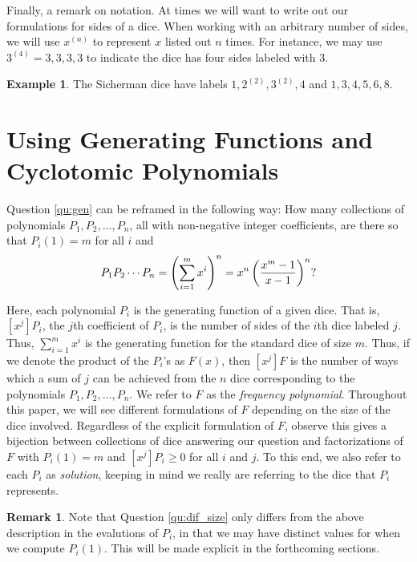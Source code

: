 \documentclass[11pt]{amsart}
\numberwithin{equation}{section}
\theoremstyle{plain}
\theoremstyle{definition}
\newtheorem{example}[equation]{Example}
\newtheorem{remark}[equation]{Remark}
\begin{document}
Finally, a remark on notation. At times we will want to write out our formulations for sides of a dice. When working with an arbitrary number of sides, we will use $x^{(n)}$ to represent $x$ listed out $n$ times. For instance, we may use $3^{(4)}=3,3,3,3$ to indicate the dice has four sides labeled with $3$.

\begin{example}
The Sicherman dice have labels $1,2^{(2)},3^{(2)},4$ and $1,3,4,5,6,8$.
\end{example}

\section{Using Generating Functions and Cyclotomic Polynomials} \label{sec:cyc}

Question \ref{qu:gen} can be reframed in the following way: How many collections of polynomials $P_1,P_2,\dots, P_n$, all with non-negative integer coefficients, are there so that  $P_i(1)=m$ for all $i$ and
\[P_1P_2\cdots P_n=\left( \sum_{i=1}^m x^i \right)^n=x^n\left( {x^m-1\over x-1}\right)^n?\]

Here, each polynomial $P_i$ is the generating function of a given dice. That is, $[x^j]P_i$, the $j$th coefficient of $P_i$, is the number of sides of the $i$th dice labeled $j$. Thus, $\displaystyle \sum_{i=1}^m x^i$ is the generating function for the standard dice of size $m$. Thus, if we denote the product of the $P_i$'s as $F(x)$, then $[x^j]F$ is the number of ways which a sum of $j$ can be achieved from the $n$ dice corresponding to the polynomials $P_1,P_2,\dots, P_n$. We refer to $F$ as the \textit{frequency polynomial}. Throughout this paper, we will see different formulations of $F$ depending on the size of the dice involved. Regardless of the explicit formulation of $F$, observe this gives a bijection between collections of dice answering our question and factorizations of $F$ with $P_i(1)=m$ and $[x^j]P_i\geq 0$ for all $i$ and $j$. To this end, we also refer to each $P_i$ as \textit{solution}, keeping in mind we really are referring to the dice that $P_i$ represents. 

\begin{remark}
Note that Question \ref{qu:dif_size} only differs from the above description in the evalutions of $P_i$, in that we may have distinct values for when we compute $P_i(1)$. This will be made explicit in the forthcoming sections.
\end{remark}
\end{document}

